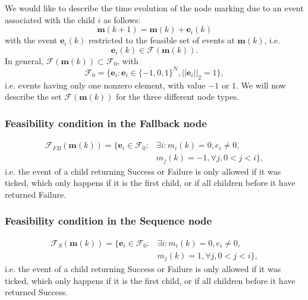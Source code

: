 We would like to describe the time evolution of the node marking due to an event associated with the child $i$ as follows:
\begin{equation}
 \mathbf{m}(k+1)=\mathbf{m}(k)+\mathbf{e}_i(k)
\end{equation}
 with the event $\mathbf{e}_i(k)$ restricted to the feasible set of events at $\mathbf{m}(k)$, i.e. 
 $$\mathbf{e}_i(k) \in \mathcal{F}(\mathbf{m}(k)).$$ 
In general, $\mathcal{F}(\mathbf{m}(k)) \subset \mathcal{F}_0$, with
\begin{equation}
 \mathcal{F}_0=\{\mathbf{e}_i: \mathbf{e}_i\in \{-1,0,1\}^N, ||\mathbf{e}_i||_2=1 \},
\end{equation}
i.e. events having only one nonzero element, with value $-1$ or $1$. We will now describe the set $\mathcal{F}(\mathbf{m}(k))$ for the three different node types.

\subsubsection*{Feasibility condition in the Fallback node}
\begin{equation}
\begin{split}
\mathcal{F}_{FB}(\mathbf{m}(k))=\{\mathbf{e}_i\in  \mathcal{F}_0: & \exists i: m_i(k)=0, e_i \neq 0, \\ & m_j(k) = -1, \forall j, 0<j<i  \},
\end{split}
\end{equation}
i.e. the event of a child returning Success or Failure is only allowed if it was ticked, which only happens if it is the first child, or if all children before it have returned Failure.

\subsubsection*{Feasibility condition in the Sequence node}
\begin{equation}
\begin{split}
\mathcal{F}_{S}(\mathbf{m}(k))=\{\mathbf{e}_i\in  \mathcal{F}_0: & \exists i: m_i(k)=0, e_i \neq 0,  \\ & m_j(k) = 1, \forall j, 0<j<i  \},
\end{split}
\end{equation}
i.e. the event of a child returning Success or Failure is only allowed if it was ticked, which only happens if it is the first child, or if all children before it have returned Success.

